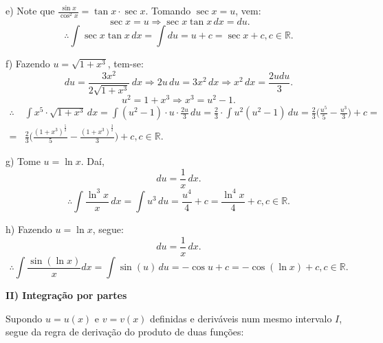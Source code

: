 \documentclass{article}
\begin{document}
{\begin{newpage}
\par
\vspace{0.3cm}
e) Note que $\displaystyle{\frac{\sin{x}}{\cos^{2}{x}} = \tan{x}\cdot\sec{x}}$. Tomando $\sec{x} = u$, vem:
\begin{equation*}\displaystyle{\sec{x} = u \Rightarrow \sec{x}\tan{x}\, dx = du}.\end{equation*}
$$\therefore \displaystyle{\int \sec{x}\tan{x}\, dx = \int du = u + c = \sec{x} + c, c\in\mathbb{R}}.$$
\par
\vspace{0.3cm}
f) Fazendo $u = \sqrt{1 + x^{3}}$, tem-se:
\begin{equation*} \displaystyle{du = \frac{3x^{2}}{2\sqrt{1 + x^{3}}}\, dx \Rightarrow 2u\, du = 3x^{2}\, dx \Rightarrow x^{2}\, dx = \frac{2udu}{3}}.\end{equation*}
\begin{equation*} u^{2} = 1 + x^3 \Rightarrow x^{3} = u^{2} - 1.\end{equation*}
$$ \displaystyle{\begin{split}\therefore &\int x^{5}\cdot\sqrt{1 + x^{3}}\, dx = \int (u^{2} - 1)\cdot u\cdot\frac{2u}{3}\, du = \frac{2}{3}\cdot\int u^{2}(u^2 - 1)\, du = \frac{2}{3}\Big(\frac{u^5}{5} - \frac{u^3}{3}\Big) + c = \\ = &\frac{2}{3}\Big( \frac{(1 + x^3)^{\frac{5}{2}}}{5} - \frac{(1 + x^3)^{\frac{3}{2}}}{3}\Big) + c, c\in\mathbb{R}.\end{split}}$$
\par
\vspace{0.3cm}
g) Tome $u = \ln{x}$. Daí,
\begin{equation*} \displaystyle{du = \frac{1}{x}\, dx}. \end{equation*}
$$\therefore \int \frac{\ln^{3}{x}}{x}\, dx = \int u^{3}\, du = \frac{u^{4}}{4} + c = \frac{\ln^{4}{x}}{4} + c, c\in\mathbb{R}. $$
\par
\vspace{0.3cm}
h) Fazendo $u = \ln{x}$, segue:
\begin{equation*} du = \displaystyle{\frac{1}{x}\, dx}. \end{equation*}
$$\therefore \displaystyle{\int \frac{\sin{(\ln{x})}}{x} dx = \int \sin{(u)}\, du = -\cos{u} + c = -\cos{(\ln{x})} + c, c\in\mathbb{R}}.$$
\par
\vspace{0.3cm}
\textbf{II) Integração por partes}
\par Supondo $u=u(x)$ e $v=v(x)$ definidas e deriváveis num mesmo intervalo $I$, segue da regra de derivação do produto de duas funções:

\end{newpage}}
\end{document}
